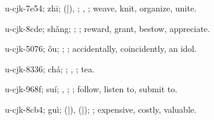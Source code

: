\begin{multicols}{2}
{\cjkgGlue{}u-cjk-7e54; zhī; \cjkgGlue{}\cjkgGlue{}(\cjkgGlue{}|\cjkgGlue{}), \cjkgGlue{}; \cjkgGlue{}, \cjkgGlue{}; weave, knit, organize, unite.

\cjkgGlue{}u-cjk-8cde; shǎng; \cjkgGlue{}\cjkgGlue{}\cjkgGlue{}; \cjkgGlue{}; reward, grant, bestow, appreciate.

\cjkgGlue{}u-cjk-5076; ǒu; \cjkgGlue{}; \cjkgGlue{}; accidentally, coincidently, an idol.

\cjkgGlue{}u-cjk-8336; chá; \cjkgGlue{}; \cjkgGlue{}, \cjkgGlue{}; tea.

\cjkgGlue{}u-cjk-968f; suí; \cjkgGlue{}, \cjkgGlue{}\cjkgGlue{}\cjkgGlue{}; \cjkgGlue{}; follow, listen to, submit to.

\cjkgGlue{}u-cjk-8cb4; guì; \cjkgGlue{}\cjkgGlue{}(\cjkgGlue{}|\cjkgGlue{}), \cjkgGlue{}\cjkgGlue{}(\cjkgGlue{}|\cjkgGlue{}); \cjkgGlue{}; expensive, costly, valuable.

}
\end{multicols}
